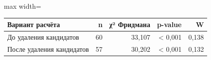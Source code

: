 {%
\small
\setlength{\tabcolsep}{3.0pt}
\renewcommand{\arraystretch}{1.12}
\begin{adjustbox}{max width=\textwidth}
\begin{tabular}{lrrrr}
\toprule
Вариант расчёта & n & χ² Фридмана & p-value & W \\
\midrule
До удаления кандидатов & 60 & 33,107 & < 0,001 & 0,138 \\
После удаления кандидатов & 57 & 30,202 & < 0,001 & 0,132 \\
\bottomrule
\end{tabular}
\end{adjustbox}
}